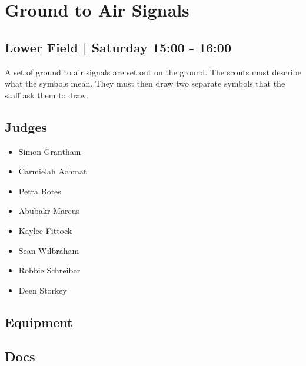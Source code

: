 \documentclass[10pt]{article}
\begin{document}
		\begin{minipage}{\linewidth}
		\setcounter{section}{8}
	\section{Ground to Air Signals }
	\subsection*{Lower Field | Saturday 15:00 - 16:00}

	A set of ground to air signals are set out on the ground. The scouts must describe what the symbols mean. They must then draw two separate symbols that the staff ask them to draw.

	\begin{multicols}{2}
	\subsection*{\faUsers \: Judges}
	\begin{itemize}
			\item Simon Grantham
			\item Carmielah Achmat
			\item Petra Botes
			\item Abubakr Marcus
			\item Kaylee Fittock
			\item Sean Wilbraham
			\item Robbie Schreiber
			\item Deen Storkey
		\end{itemize}
	\columnbreak
	\subsection*{\faWrench \: Equipment}
	        \vfill\null
        \subsection*{\faFile \: Docs}
     	\end{multicols}


	\vspace{1cm}
	\end{minipage}
\end{document}
